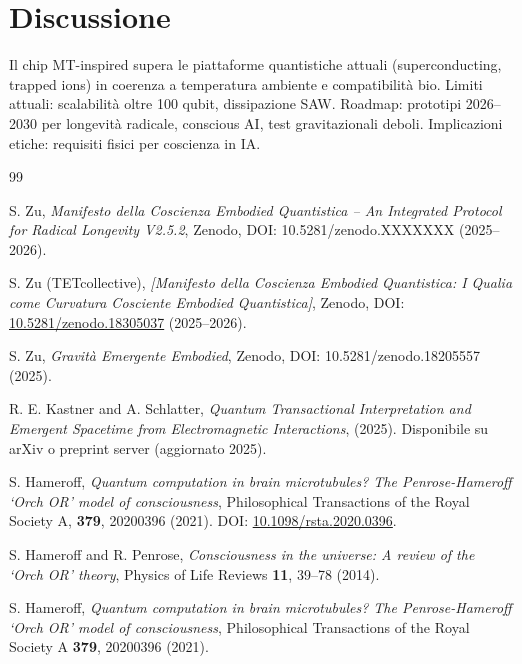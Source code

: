 \documentclass[12pt,a4paper]{article}
\begin{document}
\section{Discussione}

Il chip MT-inspired supera le piattaforme quantistiche attuali (superconducting, trapped ions) in coerenza a temperatura ambiente e compatibilità bio. Limiti attuali: scalabilità oltre 100 qubit, dissipazione SAW. Roadmap: prototipi 2026--2030 per longevità radicale, conscious AI, test gravitazionali deboli. Implicazioni etiche: requisiti fisici per coscienza in IA.




\vspace{1cm}




\begin{thebibliography}{99}

S. Zu, \textit{Manifesto della Coscienza Embodied Quantistica -- An Integrated Protocol for Radical Longevity V2.5.2}, Zenodo, DOI: 10.5281/zenodo.XXXXXXX (2025--2026).

S. Zu (TETcollective), \textit{[Manifesto della Coscienza Embodied Quantistica: I Qualia come Curvatura Cosciente Embodied Quantistica]}, Zenodo, DOI: \href{https://doi.org/10.5281/zenodo.18305037}{10.5281/zenodo.18305037} (2025--2026).


S. Zu, \textit{Gravità Emergente Embodied}, Zenodo, DOI: 10.5281/zenodo.18205557 (2025).

R. E. Kastner and A. Schlatter, 
\textit{Quantum Transactional Interpretation and Emergent Spacetime from Electromagnetic Interactions}, 
(2025). 
Disponibile su arXiv o preprint server (aggiornato 2025). 


S. Hameroff,
\textit{Quantum computation in brain microtubules? The Penrose-Hameroff `Orch OR' model of consciousness},
Philosophical Transactions of the Royal Society A,
\textbf{379}, 20200396 (2021).
DOI: \href{https://doi.org/10.1098/rsta.2020.0396}{10.1098/rsta.2020.0396}.

S. Hameroff and R. Penrose, \textit{Consciousness in the universe: A review of the `Orch OR' theory}, Physics of Life Reviews \textbf{11}, 39--78 (2014).

S. Hameroff, \textit{Quantum computation in brain microtubules? The Penrose-Hameroff `Orch OR' model of consciousness}, Philosophical Transactions of the Royal Society A \textbf{379}, 20200396 (2021).


\end{thebibliography}
\end{document}
